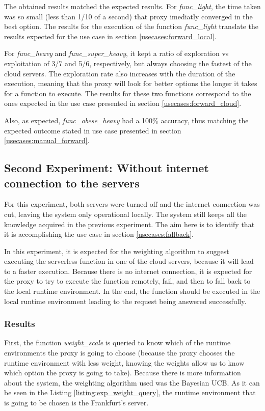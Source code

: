 The obtained results matched the expected results. For \textit{func\_light}, the
time taken was so small (less than 1/10 of a second) that proxy imediatly
converged in the best option. The results for the execution of the function
\textit{func\_light} translate the results expected for the use case
in section \ref{usecases:forward_local}.

For \textit{func\_heavy} and \textit{func\_super\_heavy}, it kept a ratio of
exploration vs exploitation of 3/7 and 5/6, respectively, but always choosing the
fastest of the cloud servers. The exploration rate also increases with the
duration of the execution, meaning that the proxy will look for better options the
longer it takes for a function to execute. The results for these two functions
correspond to the ones expected in the use case presented in section \ref{usecases:forward_cloud}.

Also, as expected, \textit{func\_obese\_heavy} had a 100\% accuracy, thus matching
the expected outcome stated in use case presented in section \ref{usecases:manual_forward}.

\subsection{Second Experiment: Without internet connection to the servers}
For this experiment, both servers were turned off and the internet connection was
cut, leaving the system only operational locally. The system still keeps all the
knowledge acquired in the previous experiment.
The aim here is to identify that it is accomplishing the use case
in section \ref{usecases:fallback}.

In this experiment, it is expected for the weighting algorithm to suggest
executing the serverless function in one of the cloud servers, because it will
lead to a faster execution. Because there is no internet connection, it is
expected for the proxy to try to execute the function remotely, fail, and then to
fall back to the local runtime environment. In the end, the function should be
executed in the local runtime environment leading to the request being answered
successfully.

\subsubsection{Results}
First, the function \textit{weight\_scale} is queried to know which of the runtime
environments the proxy is going to choose (because the proxy chooses the runtime environment with less weight, knowing the weights allow us to know which option
the proxy is going to take). Because there is more information about the system,
the weighting algorithm used was the Bayesian UCB. As it can be seen in the Listing
\ref{listing:exp_weight_query}, the runtime environment that is going to be
chosen is the Frankfurt's server.

